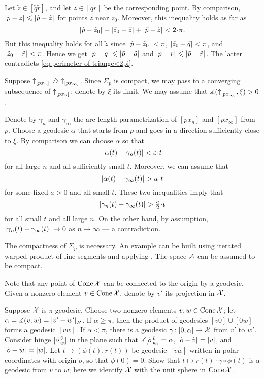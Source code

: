 Let $\tilde z\in [\tilde q\tilde r]$,
and let $z\in [q r]$ be the corresponding point.
By comparison, $|{p}-{z}|_{}^{{}}\leqslant|{\tilde p}-{\tilde z}|_{}^{{}}$ for points $z$ near $z_0$.
Moreover, this inequality holds as far as 
\[\dist{\tilde p}{\tilde z_0}{}+\dist{\tilde z_0}{\tilde z}{}+\dist{\tilde p}{\tilde z}{}<2\cdot\pi.\]
But this inequality holds for all $\tilde z$ since  $|{\tilde p}-{\tilde z_0}|_{}^{{}}<\pi$, $|{\tilde z_0}-{\tilde q}|_{}^{{}}<\pi$, and $|{\tilde z_0}-{\tilde r}|_{}^{{}}<\pi$.
Hence we get $|{p}-{q}|_{}^{{}}\leqslant|{\tilde p}-{\tilde q}|_{}^{{}}$ and $|{p}-{r}|_{}^{{}}\leqslant|{\tilde p}-{\tilde r}|_{}^{{}}$.
The latter contradicts \ref{eq:perimeter-of-triange<2pi}.

Suppose ${\uparrow}_{[{p}{x_n}]_{{}}}\not\to{\uparrow}_{[{p}{x_\infty}]_{{}}}$.
Since $\Sigma_p$ is compact, we may pass to a converging subsequence of ${\uparrow}_{[{p}{x_n}]_{{}}}$;
denote by $\xi$ its limit.
We may assume that $\measuredangle ({\uparrow}_{[{p}{x_\infty}]_{{}}},\xi)>0$.

Denote by $\gamma_n$ and $\gamma_\infty$ the arc-length parametrization of $[px_n]$ and $[px_\infty]$ from $p$.
Choose a geodesic $\alpha$ that starts from $p$ and goes in a direction sufficiently close to $\xi$.
By comparison we can choose $\alpha$ so that
\[\dist{\alpha(t)}{\gamma_n(t)}{}<\eps\cdot t\]
for all large $n$ and all sufficiently small $t$.
Moreover, we can assume that
\[\dist{\alpha(t)}{\gamma_\infty(t)}{}>a\cdot t\]
for some fixed $a>0$ and all small $t$.
These two inequalities imply 
that 
\[\dist{\gamma_n(t)}{\gamma_\infty(t)}{}>\tfrac a2\cdot t\]
for all small $t$ and all large $n$.
On the other hand, by assumption, $|{\gamma_n(t)}-{\gamma_\infty(t)}|_{}^{{}}\to0$ as $n\to\infty$ --- a contradiction.

The compactness of $\Sigma_p$ is necessary.
An example can be built using iterated warped product of line segments and applying \cite[Theorem 1.2]{alexander-bishop2004}.
The space $\mathcal{A}$ can be assumed to be compact.


Note that any point of $\mathop{\rm Cone}\nolimits \mathcal{X}$ can be connected to the origin by a geodesic.
Given a nonzero element $v\in\mathop{\rm Cone}\nolimits \mathcal{X}$, denote by $v'$ its projection in $\mathcal{X}$.

Suppose $\mathcal{X}$ is $\pi$-geodesic.
Choose two nonzero elements $v,w\in\mathop{\rm Cone}\nolimits \mathcal{X}$; let $\alpha=\measuredangle(v,w)=|{v'}-{w'}|_{\mathcal{X}}^{{}}$.
If $\alpha\ge \pi$, then the product of geodesics $[v0]\cup [0w]$ forms a geodesic $[vw]$.
If $\alpha<\pi$, there is a geodesic $\gamma\colon[0,\alpha]\to \mathcal{X}$ from $v'$ to $w'$.
Consider hinge $[\tilde o\,{}^{\tilde v}_{\tilde w}]$ in the plane 
such that $\measuredangle[\tilde o\,{}^{\tilde v}_{\tilde w}]=\alpha$, $|{\tilde o}-{\tilde v}|_{}^{{}}=|v|$, and $|{\tilde o}-{\tilde w}|_{}^{{}}=|w|$.
Let $t\mapsto (\phi(t),r(t))$ be geodesic $[\tilde v\tilde w]$ written in polar coordinates with origin $\tilde o$, so that $\phi(0)=0$.
Show that $t\mapsto r(t)\cdot\gamma\circ\phi(t)$ is a geodesic from $v$ to $w$;
here we identify $\mathcal{X}$ with the unit sphere in $\mathop{\rm Cone}\nolimits \mathcal{X}$.


